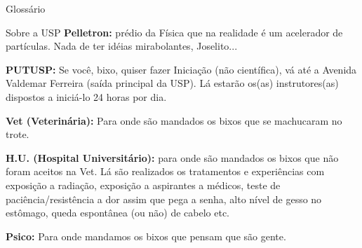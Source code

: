 \begin{secao}{Glossário}
\begin{subsecao}{Sobre a USP}
{\bf Pelletron:} prédio da Física que na realidade é um acelerador de partículas. Nada de ter idéias mirabolantes, Joselito... 

{\bf PUTUSP:} Se você, bixo, quiser fazer Iniciação (não científica), vá até a
Avenida Valdemar Ferreira (saída principal da USP). Lá estarão os(as)
instrutores(as) dispostos a iniciá-lo 24 horas por dia.

{\bf Vet (Veterinária):} Para
onde são mandados os bixos que se machucaram no trote.

{\bf H.U. (Hospital Universitário):} para onde são mandados os bixos que não foram aceitos na Vet. Lá são realizados os tratamentos e experiências com exposição a radiação, exposição a aspirantes a médicos, teste de paciência/resistência a dor assim que pega a senha, alto nível de gesso no estômago, queda espontânea (ou não) de cabelo etc.

{\bf Psico:} Para onde mandamos os bixos que pensam que são gente.

\end{subsecao}
\end{secao}
